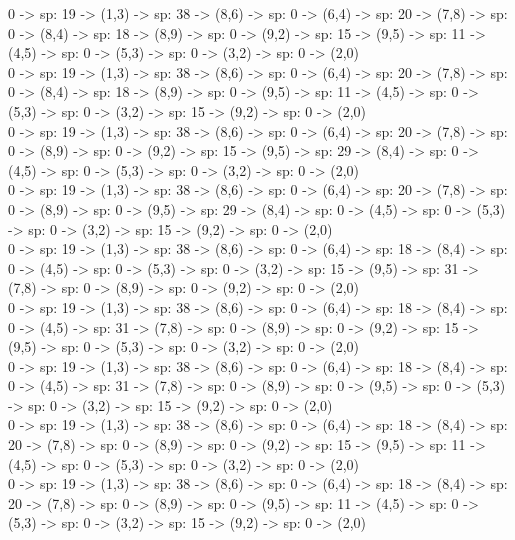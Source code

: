 \documentclass[10pt,a4paper]{article}
\begin{document}
0 -> sp: 19 -> (1,3) -> sp: 38 -> (8,6) -> sp: 0 -> (6,4) -> sp: 20 -> (7,8) -> sp: 0 -> (8,4) -> sp: 18 -> (8,9) -> sp: 0 -> (9,2) -> sp: 15 -> (9,5) -> sp: 11 -> (4,5) -> sp: 0 -> (5,3) -> sp: 0 -> (3,2) -> sp: 0 -> (2,0)\\

0 -> sp: 19 -> (1,3) -> sp: 38 -> (8,6) -> sp: 0 -> (6,4) -> sp: 20 -> (7,8) -> sp: 0 -> (8,4) -> sp: 18 -> (8,9) -> sp: 0 -> (9,5) -> sp: 11 -> (4,5) -> sp: 0 -> (5,3) -> sp: 0 -> (3,2) -> sp: 15 -> (9,2) -> sp: 0 -> (2,0)\\

0 -> sp: 19 -> (1,3) -> sp: 38 -> (8,6) -> sp: 0 -> (6,4) -> sp: 20 -> (7,8) -> sp: 0 -> (8,9) -> sp: 0 -> (9,2) -> sp: 15 -> (9,5) -> sp: 29 -> (8,4) -> sp: 0 -> (4,5) -> sp: 0 -> (5,3) -> sp: 0 -> (3,2) -> sp: 0 -> (2,0)\\

0 -> sp: 19 -> (1,3) -> sp: 38 -> (8,6) -> sp: 0 -> (6,4) -> sp: 20 -> (7,8) -> sp: 0 -> (8,9) -> sp: 0 -> (9,5) -> sp: 29 -> (8,4) -> sp: 0 -> (4,5) -> sp: 0 -> (5,3) -> sp: 0 -> (3,2) -> sp: 15 -> (9,2) -> sp: 0 -> (2,0)\\

0 -> sp: 19 -> (1,3) -> sp: 38 -> (8,6) -> sp: 0 -> (6,4) -> sp: 18 -> (8,4) -> sp: 0 -> (4,5) -> sp: 0 -> (5,3) -> sp: 0 -> (3,2) -> sp: 15 -> (9,5) -> sp: 31 -> (7,8) -> sp: 0 -> (8,9) -> sp: 0 -> (9,2) -> sp: 0 -> (2,0)\\

0 -> sp: 19 -> (1,3) -> sp: 38 -> (8,6) -> sp: 0 -> (6,4) -> sp: 18 -> (8,4) -> sp: 0 -> (4,5) -> sp: 31 -> (7,8) -> sp: 0 -> (8,9) -> sp: 0 -> (9,2) -> sp: 15 -> (9,5) -> sp: 0 -> (5,3) -> sp: 0 -> (3,2) -> sp: 0 -> (2,0)\\

0 -> sp: 19 -> (1,3) -> sp: 38 -> (8,6) -> sp: 0 -> (6,4) -> sp: 18 -> (8,4) -> sp: 0 -> (4,5) -> sp: 31 -> (7,8) -> sp: 0 -> (8,9) -> sp: 0 -> (9,5) -> sp: 0 -> (5,3) -> sp: 0 -> (3,2) -> sp: 15 -> (9,2) -> sp: 0 -> (2,0)\\

0 -> sp: 19 -> (1,3) -> sp: 38 -> (8,6) -> sp: 0 -> (6,4) -> sp: 18 -> (8,4) -> sp: 20 -> (7,8) -> sp: 0 -> (8,9) -> sp: 0 -> (9,2) -> sp: 15 -> (9,5) -> sp: 11 -> (4,5) -> sp: 0 -> (5,3) -> sp: 0 -> (3,2) -> sp: 0 -> (2,0)\\

0 -> sp: 19 -> (1,3) -> sp: 38 -> (8,6) -> sp: 0 -> (6,4) -> sp: 18 -> (8,4) -> sp: 20 -> (7,8) -> sp: 0 -> (8,9) -> sp: 0 -> (9,5) -> sp: 11 -> (4,5) -> sp: 0 -> (5,3) -> sp: 0 -> (3,2) -> sp: 15 -> (9,2) -> sp: 0 -> (2,0)\\
\end{document}
